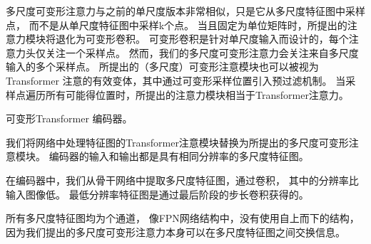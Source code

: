 多尺度可变形注意力与之前的单尺度版本非常相似，只是它从多尺度特征图中采样点，
而不是从单尺度特征图中采样k个点。
当且固定为单位矩阵时，所提出的注意力模块将退化为可变形卷积。
可变形卷积是针对单尺度输入而设计的，每个注意力头仅关注一个采样点。
然而，我们的多尺度可变形注意力会关注来自多尺度输入的多个采样点。
所提出的（多尺度）可变形注意模块也可以被视为
Transformer 注意的有效变体，其中通过可变形采样位置引入预过滤机制。
当采样点遍历所有可能得位置时，所提出的注意力模块相当于Transformer注意力。


可变形Transformer 编码器。

我们将网络中处理特征图的Transformer注意模块替换为所提出的多尺度可变形注意模块。
编码器的输入和输出都是具有相同分辨率的多尺度特征图。

在编码器中，我们从骨干网络中提取多尺度特征图，通过卷积，
其中的分辨率比输入图像低。
最低分辨率特征图是通过最后阶段的步长卷积获得的。

所有多尺度特征图均为个通道，
像FPN网络结构中，没有使用自上而下的结构，因为我们提出的多尺度可变形注意力本身可以在多尺度特征图之间交换信息。






